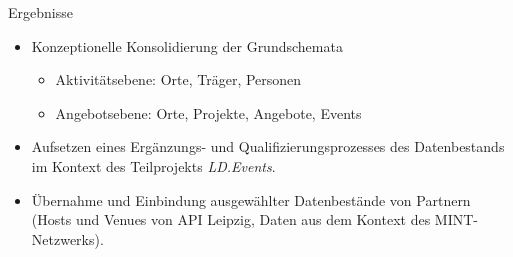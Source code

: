 \documentclass{beamer}
\begin{document}
\begin{frame}{Ergebnisse}{}
\begin{itemize} 
\item Konzeptionelle Konsolidierung der Grundschemata
\begin{itemize} 
\item Aktivitätsebene: Orte, Träger, Personen
\item Angebotsebene: Orte, Projekte, Angebote, Events
\end{itemize}
\item Aufsetzen eines Ergänzungs- und Qualifizierungsprozesses des
  Datenbestands im Kontext des Teilprojekts \emph{LD.Events}.
\item Übernahme und Einbindung ausgewählter Datenbestände von Partnern (Hosts
  und Venues von API Leipzig, Daten aus dem Kontext des MINT-Netzwerks). 
\end{itemize}
\end{frame}
\end{document}
